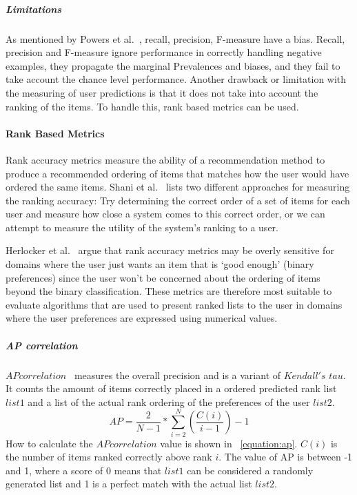 \subparagraph{Limitations}
\label{subp:limitations}
As mentioned by Powers et al.~\cite{powers2007}, recall, precision, F-measure have a bias.
Recall, precision and F-measure ignore performance in correctly handling negative examples, they propagate the marginal Prevalences and biases, and they fail to take account the chance level performance.
Another drawback or limitation with the measuring of user predictions is that it does not take into account the ranking of the items. To handle this, rank based metrics can be used.

\paragraph{Rank Based Metrics}
\label{para:rank_based}
Rank accuracy metrics measure the ability of a recommendation method to produce
a recommended ordering of items that matches how the user would have ordered
the same items. Shani et al.~\cite{Shani2011} lists two different approaches
for measuring the ranking accuracy: Try determining the correct order of a set
of items for each user and measure how close a system comes to this correct
order, or we can attempt to measure the utility of the system's ranking to a
user.

Herlocker et al.~\cite{Herlocker2004} argue that rank accuracy metrics may be
overly sensitive for domains where the user just wants an item that is `good
enough' (binary preferences) since the user won't be concerned about the
ordering of items beyond the binary classification. These metrics are therefore
most suitable to evaluate algorithms that are used to present ranked lists to
the user in domains where the user preferences are expressed using numerical
values.

\subparagraph{AP correlation}
\label{subp:ap_correlation}
$AP correlation$~\cite{Yilmaz:2008:NRC:1390334.1390435} measures the overall precision and is a variant of $Kendall's$ $tau$.
It counts the amount of items correctly placed in a ordered predicted rank list $list1$ and a list of the actual rank ordering of the preferences of the user $list2$.
\begin{equation}
	AP = \frac{2}{N - 1} * \sum_{i=2}^{N}{(\frac{C(i)}{i - 1})} - 1
	\label{equation:ap}
\end{equation}
How to calculate the $AP correlation$ value is shown in ~\ref{equation:ap}.
$C(i)$ is the number of items ranked correctly above rank $i$.
The value of AP is between -1 and 1, where a score of 0 means that $list1$ can be considered a randomly generated list and 1 is a perfect match with the actual list $list2$.

